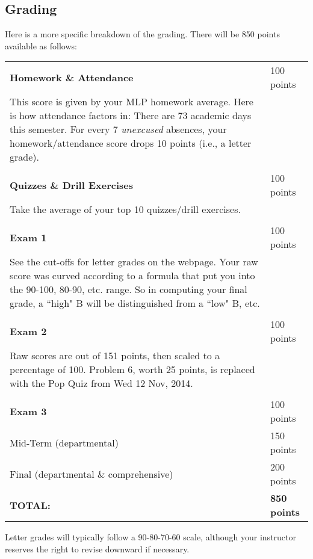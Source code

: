 \documentclass[margin,line,pifont,palatino,courier]{res}
\begin{document}
\begin{resume}
\section{\sc Grading} Here is a more specific breakdown of the grading.  There will be 850 points available as follows:

\begin{center}
\begin{supertabular}{@{}p{0.6\textwidth} l}
	{\bf Homework \& Attendance} & 100 points \\
		\hspace{5pt}This score is given by your MLP homework average.  Here is how attendance factors in:  There are 73 academic days this semester. For every 7 {\it unexcused} absences, your homework/attendance score drops 10 points (i.e., a letter grade). 
		& \\
		 & \\
{\bf Quizzes \& Drill Exercises} & 100 points \\
	\hspace{5pt} Take the average of your top 10 quizzes/drill exercises. & \\
 & \\
 {\bf Exam 1} & 100 points \\
   \hspace{5pt} See the cut-offs for letter grades on the webpage.  Your raw score was curved according to a formula that put you into the 90-100, 80-90, etc. range.  So in computing your final grade, a ``high" B will be distinguished from a ``low" B, etc. & \\
 & \\
{\bf Exam 2} & 100 points \\
	\hspace{5pt} Raw scores are out of 151 points, then scaled to a percentage of 100.  Problem 6, worth 25 points, is replaced with the Pop Quiz from Wed 12 Nov, 2014.  & \\
 & \\
 {\bf Exam 3} & 100 points \\
Mid-Term (departmental) & 150 points \\ 
Final (departmental \& comprehensive) & 200 points \\
{\bf TOTAL:} & {\bf 850 points} \\
\end{supertabular}
\end{center}

Letter grades will typically follow a 90-80-70-60 scale, although your instructor reserves the right to revise downward if necessary.


\end{resume}
\end{document}
